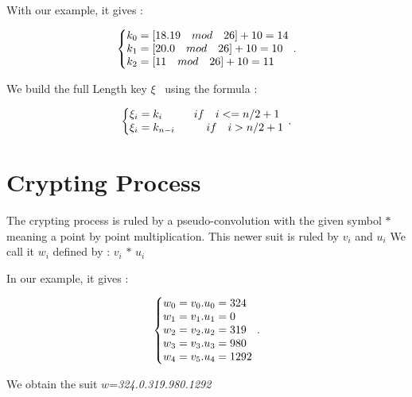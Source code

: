 \documentclass{article}
\begin{document}
With our example, it gives :

\begin{equation}
\centering
\left\{\begin{array}{@{}l@{}}
k_{0}=[18.19 \quad  mod \quad  26] + 10 = 14 \\
k_{1}=[20.0 \quad  mod \quad  26] + 10 = 10 \\
k_{2}=[11 \quad  mod \quad  26] + 10 = 11 \\
\end{array}\right.\,.
\end{equation}

We build the full Length key $\xi$  \ using the formula :

\begin{equation}
\centering
\left\{\begin{array}{@{}l@{}}
\xi_{i} = k_{i} \hspace*{1cm} if \quad i <= n/2 + 1 \\ 
\xi_{i} = k_{n-i} \hspace*{1cm} if \quad i > n/2 + 1 \\ 
\end{array}\right.\,.
\end{equation}

\newpage

\section*{Crypting Process}
\begin{flushleft}
The crypting process is ruled by a pseudo-convolution with the given symbol $*$ meaning a point by point multiplication. 
This newer suit is ruled by $v_{i}$ and $u_{i}$
We call it $w_{i}$ defined by : $v_{i}$ $*$ $u_{i}$

In our example, it gives :
\end{flushleft}

\begin{equation}
\centering
\left\{\begin{array}{@{}l@{}}
w_{0}=v_{0}.u_{0}=324 \\
w_{1}=v_{1}.u_{1}=0 \\
w_{2}=v_{2}.u_{2}=319 \\
w_{3}=v_{3}.u_{3}=980 \\
w_{4}=v_{5}.u_{4}=1292 \\
\end{array}\right.\,.
\end{equation}

\begin{flushleft}
We obtain the suit $w$=\textit{324.0.319.980.1292}
\end{flushleft}
\end{document}

